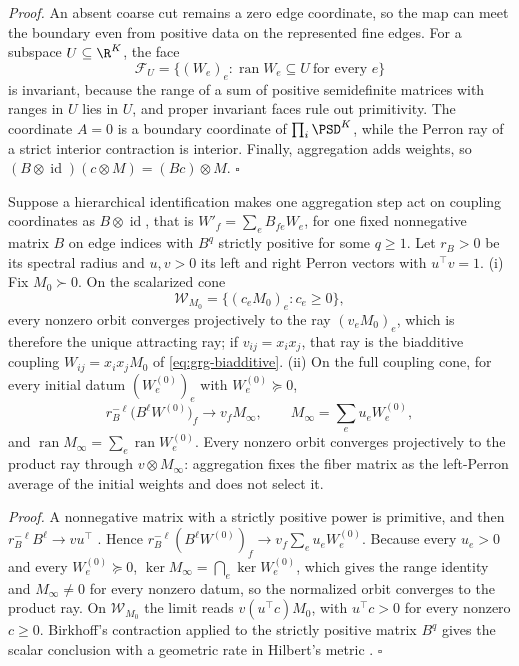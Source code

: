 \noindent\emph{Proof.}
An absent coarse cut remains a zero edge coordinate, so the map can meet the
boundary even from positive data on the represented fine edges. For a subspace
\(U\subseteq\R^K\), the face
\begin{equation}
\mathcal F_U=\{(W_e)_e:\operatorname{ran}W_e\subseteq U\ \text{for every }e\}
\label{eq:grg-common-range-face}
\end{equation}
is invariant, because the range of a sum of positive semidefinite matrices
with ranges in \(U\) lies in \(U\), and proper invariant faces rule out
primitivity. The coordinate \(A=0\) is a boundary coordinate of
\(\prod_i\PSD^K\), while the Perron ray of a strict interior contraction is
interior. Finally, aggregation adds weights, so
\((B\otimes\operatorname{id})(c\otimes M)=(Bc)\otimes M\). \(\square\)

Suppose a hierarchical identification makes one aggregation step act on
coupling coordinates as \(B\otimes\operatorname{id}\), that is
\(W'_f=\sum_eB_{fe}W_e\), for one fixed nonnegative matrix \(B\) on edge indices
with \(B^q\) strictly positive for some \(q\geq1\). Let \(r_B>0\) be its spectral
radius and \(u,v>0\) its left and right Perron vectors with \(u^\top v=1\).
(i) Fix \(M_0\succ0\). On the scalarized cone
\begin{equation}
\mathcal W_{M_0}=\{(c_eM_0)_e:c_e\geq0\},
\label{eq:grg-scalarized-cone}
\end{equation}
every nonzero orbit converges projectively to the ray \((v_eM_0)_e\), which is
therefore the unique attracting ray; if \(v_{ij}=x_ix_j\), that ray is the
biadditive coupling \(W_{ij}=x_ix_jM_0\) of \eqref{eq:grg-biadditive}.
(ii) On the full coupling cone, for every initial datum \((W_e^{(0)})_e\) with
\(W_e^{(0)}\succeq0\),
\begin{equation}
r_B^{-\ell}\bigl(B^\ell W^{(0)}\bigr)_f\longrightarrow v_fM_\infty,
\qquad
M_\infty=\sum_eu_eW_e^{(0)},
\label{eq:grg-full-cone-perron-limit}
\end{equation}
and \(\operatorname{ran}M_\infty=\sum_e\operatorname{ran}W_e^{(0)}\). Every
nonzero orbit converges projectively to the product ray through
\(v\otimes M_\infty\): aggregation fixes the fiber matrix as the left-Perron
average of the initial weights and does not select it. 

\noindent\emph{Proof.}
A nonnegative matrix with a strictly positive power is primitive, and then
\(r_B^{-\ell}B^\ell\to vu^\top\) \citep[\S8.5]{HornJohnson2013}. Hence
\(r_B^{-\ell}(B^\ell W^{(0)})_f\to v_f\sum_eu_eW_e^{(0)}\). Because every
\(u_e>0\) and every \(W_e^{(0)}\succeq0\),
\(\ker M_\infty=\bigcap_e\ker W_e^{(0)}\), which gives the range identity and
\(M_\infty\neq0\) for every nonzero datum, so the normalized orbit converges to
the product ray. On \(\mathcal W_{M_0}\) the limit reads \(v(u^\top c)M_0\), with
\(u^\top c>0\) for every nonzero \(c\geq0\). Birkhoff's contraction applied to the
strictly positive matrix \(B^q\) gives the scalar conclusion with a geometric
rate in Hilbert's metric \citep{Birkhoff1957}. \(\square\)

